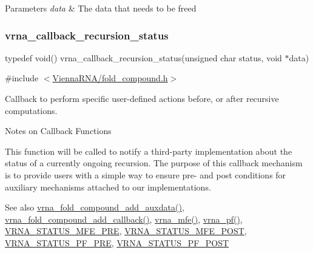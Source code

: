\begin{DoxyParams}{Parameters}
{\em data} & The data that needs to be free\textquotesingle{}d \\
\hline
\end{DoxyParams}
\mbox{\label{group__fold__compound_gac86036fa8cad1108832335063243cdc8}} 
\subsubsection{\texorpdfstring{vrna\+\_\+callback\+\_\+recursion\+\_\+status}{vrna\_callback\_recursion\_status}}
{\footnotesize\ttfamily typedef void() vrna\+\_\+callback\+\_\+recursion\+\_\+status(unsigned char status, void $\ast$data)}



{\ttfamily \#include $<$\hyperlink{fold__compound_8h}{Vienna\+R\+N\+A/fold\+\_\+compound.\+h}$>$}



Callback to perform specific user-\/defined actions before, or after recursive computations. 

\begin{DoxyRefDesc}{Notes on Callback Functions}
\item[\hyperlink{callbacks__callbacks000006}{Notes on Callback Functions}]This function will be called to notify a third-\/party implementation about the status of a currently ongoing recursion. The purpose of this callback mechanism is to provide users with a simple way to ensure pre-\/ and post conditions for auxiliary mechanisms attached to our implementations. \end{DoxyRefDesc}


\begin{DoxySeeAlso}{See also}
\hyperlink{group__fold__compound_ga6316a9426bea2f742375e8df6febd3f6}{vrna\+\_\+fold\+\_\+compound\+\_\+add\+\_\+auxdata()}, \hyperlink{group__fold__compound_ga097ed6133055624667cbce8cfdebf82d}{vrna\+\_\+fold\+\_\+compound\+\_\+add\+\_\+callback()}, \hyperlink{group__mfe__fold_gabd3b147371ccf25c577f88bbbaf159fd}{vrna\+\_\+mfe()}, \hyperlink{group__pf__fold_ga29e256d688ad221b78d37f427e0e99bc}{vrna\+\_\+pf()}, \hyperlink{group__fold__compound_ga1a5053dc8acbb0111e852988726f07d6}{V\+R\+N\+A\+\_\+\+S\+T\+A\+T\+U\+S\+\_\+\+M\+F\+E\+\_\+\+P\+RE}, \hyperlink{group__fold__compound_ga47c900ca76e56e59e2e83a06e0bde641}{V\+R\+N\+A\+\_\+\+S\+T\+A\+T\+U\+S\+\_\+\+M\+F\+E\+\_\+\+P\+O\+ST}, \hyperlink{group__fold__compound_ga91795d35ebdb6f32be50459f24b3d114}{V\+R\+N\+A\+\_\+\+S\+T\+A\+T\+U\+S\+\_\+\+P\+F\+\_\+\+P\+RE}, \hyperlink{group__fold__compound_ga1c6fa243533fd026e50f7d595eaaa565}{V\+R\+N\+A\+\_\+\+S\+T\+A\+T\+U\+S\+\_\+\+P\+F\+\_\+\+P\+O\+ST}
\end{DoxySeeAlso}

